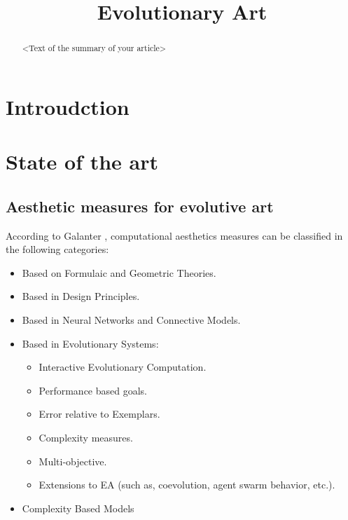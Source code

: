 \documentclass{llncs}
\title{Evolutionary Art}
\author{}
\begin{document}
\maketitle

\begin{abstract}
<Text of the summary of your article>
\end{abstract}

\section{Introudction}

\section{State of the art}

\subsection{Aesthetic measures for evolutive art}
According to Galanter \cite{galanter2012computational}, computational aesthetics measures can be classified in the following categories:
\begin{itemize}
	\item Based on Formulaic and Geometric Theories.
	\item Based in Design Principles.
	\item Based in Neural Networks and Connective Models.
	\item Based in Evolutionary Systems:
		\begin{itemize}
			\item Interactive Evolutionary Computation.
			\item Performance based goals.
			\item Error relative to Exemplars.
			\item Complexity measures.
			\item Multi-objective.
			\item Extensions to EA (such as, coevolution, agent swarm behavior, etc.).
		\end{itemize}
	\item Complexity Based Models
\end{itemize}





\end{document}
